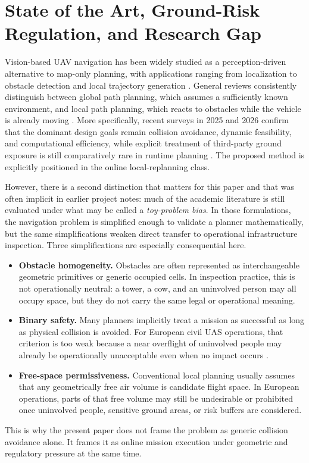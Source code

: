 \documentclass[a4paper,11pt]{article}
\begin{document}
\section{State of the Art, Ground-Risk Regulation, and Research Gap}

Vision-based UAV navigation has been widely studied as a perception-driven alternative to map-only planning, with applications ranging from localization to obstacle detection and local trajectory generation \cite{arafat2023vision,huang2025investigation}. General reviews consistently distinguish between global path planning, which assumes a sufficiently known environment, and local path planning, which reacts to obstacles while the vehicle is already moving \cite{debnath2024review,meng2025advances}. More specifically, recent surveys in 2025 and 2026 confirm that the dominant design goals remain collision avoidance, dynamic feasibility, and computational efficiency, while explicit treatment of third-party ground exposure is still comparatively rare in runtime planning \cite{merei2025survey,nafees2026review}. The proposed method is explicitly positioned in the online local-replanning class.

However, there is a second distinction that matters for this paper and that was often implicit in earlier project notes: much of the academic literature is still evaluated under what may be called a \emph{toy-problem bias}. In those formulations, the navigation problem is simplified enough to validate a planner mathematically, but the same simplifications weaken direct transfer to operational infrastructure inspection. Three simplifications are especially consequential here.
\begin{itemize}[leftmargin=1.3em]
    \item \textbf{Obstacle homogeneity.} Obstacles are often represented as interchangeable geometric primitives or generic occupied cells. In inspection practice, this is not operationally neutral: a tower, a cow, and an uninvolved person may all occupy space, but they do not carry the same legal or operational meaning.
    \item \textbf{Binary safety.} Many planners implicitly treat a mission as successful as long as physical collision is avoided. For European civil UAS operations, that criterion is too weak because a near overflight of uninvolved people may already be operationally unacceptable even when no impact occurs \cite{EU2019_947,JARUS_SORA_2_5_2024,EASA_AMC_GM_SORA25_2025}.
    \item \textbf{Free-space permissiveness.} Conventional local planning usually assumes that any geometrically free air volume is candidate flight space. In European operations, parts of that free volume may still be undesirable or prohibited once uninvolved people, sensitive ground areas, or risk buffers are considered.
\end{itemize}
This is why the present paper does not frame the problem as generic collision avoidance alone. It frames it as online mission execution under geometric and regulatory pressure at the same time.
\end{document}
